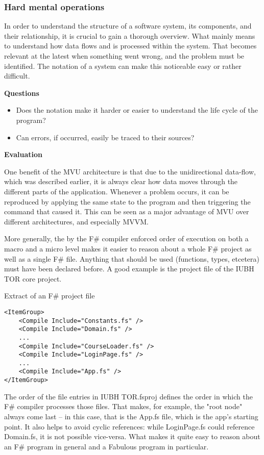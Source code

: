 \subsubsection{Hard mental operations}

In order to understand the structure of a software system, its components, and their relationship, it is crucial to gain a thorough overview. What mainly means to understand how data flows and is processed within the system. That becomes relevant at the latest when something went wrong, and the problem must be identified. The notation of a system can make this noticeable easy or rather difficult.

\textbf{Questions}

\begin{itemize}
\item Does the notation make it harder or easier to understand the life cycle of the program?
\item Can errors, if occurred, easily be traced to their sources?
\end{itemize}

\textbf{Evaluation}

One benefit of the MVU architecture is that due to the unidirectional data-flow, which was described earlier, it is always clear how data moves through the different parts of the application. Whenever a problem occurs, it can be reproduced by applying the same state to the program and then triggering the command that caused it. This can be seen as a major advantage of MVU over different architectures, and especially MVVM.

More generally, the by the F\# compiler enforced order of execution on both a macro and a micro level makes it easier to reason about a whole F\# project as well as a single F\# file. Anything that should be used (functions, types, etcetera) must have been declared before. A good example is the project file of the IUBH TOR core project.

\begin{listing}[H]
\caption{Extract of an F\# project file}
\begin{verbatim}
<ItemGroup>
    <Compile Include="Constants.fs" />
    <Compile Include="Domain.fs" />
    ...
    <Compile Include="CourseLoader.fs" />
    <Compile Include="LoginPage.fs" />
    ...
    <Compile Include="App.fs" />
</ItemGroup>
\end{verbatim}
\end{listing}

The order of the file entries in IUBH TOR.fsproj defines the order in which the F\# compiler processes those files. That makes, for example, the "root node" always come last – in this case, that is the App.fs file, which is the app's starting point. It also helps to avoid cyclic references: while LoginPage.fs could reference Domain.fs, it is not possible vice-versa. What makes it quite easy to reason about an F\# program in general and a Fabulous program in particular.

